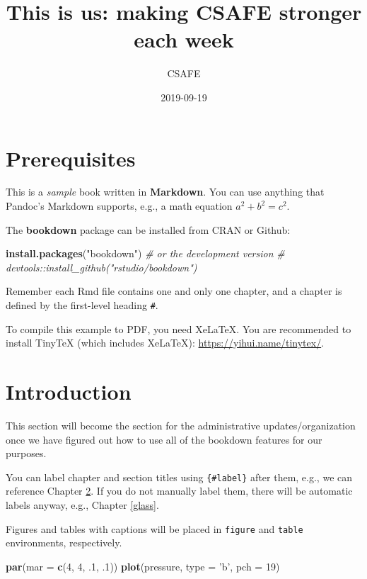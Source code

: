 \documentclass[]{book}
\title{This is us: making CSAFE stronger each week}
\author{CSAFE}
\date{2019-09-19}
\newenvironment{Shaded}{\begin{snugshade}}{\end{snugshade}}
\newcommand{\CommentTok}[1]{\textcolor[rgb]{0.56,0.35,0.01}{\textit{#1}}}
\newcommand{\DataTypeTok}[1]{\textcolor[rgb]{0.13,0.29,0.53}{#1}}
\newcommand{\DecValTok}[1]{\textcolor[rgb]{0.00,0.00,0.81}{#1}}
\newcommand{\FloatTok}[1]{\textcolor[rgb]{0.00,0.00,0.81}{#1}}
\newcommand{\KeywordTok}[1]{\textcolor[rgb]{0.13,0.29,0.53}{\textbf{#1}}}
\newcommand{\NormalTok}[1]{#1}
\newcommand{\StringTok}[1]{\textcolor[rgb]{0.31,0.60,0.02}{#1}}
\begin{document}
\maketitle

{
\setcounter{tocdepth}{1}
\tableofcontents
}
\hypertarget{prerequisites}{%
\chapter{Prerequisites}\label{prerequisites}}

This is a \emph{sample} book written in \textbf{Markdown}. You can use anything that Pandoc's Markdown supports, e.g., a math equation \(a^2 + b^2 = c^2\).

The \textbf{bookdown} package can be installed from CRAN or Github:

\begin{Shaded}
\begin{Highlighting}[]
\KeywordTok{install.packages}\NormalTok{(}\StringTok{"bookdown"}\NormalTok{)}
\CommentTok{# or the development version}
\CommentTok{# devtools::install_github("rstudio/bookdown")}
\end{Highlighting}
\end{Shaded}

Remember each Rmd file contains one and only one chapter, and a chapter is defined by the first-level heading \texttt{\#}.

To compile this example to PDF, you need XeLaTeX. You are recommended to install TinyTeX (which includes XeLaTeX): \url{https://yihui.name/tinytex/}.

\hypertarget{intro}{%
\chapter{Introduction}\label{intro}}

This section will become the section for the administrative updates/organization once we have figured out how to use all of the bookdown features for our purposes.

You can label chapter and section titles using \texttt{\{\#label\}} after them, e.g., we can reference Chapter \ref{intro}. If you do not manually label them, there will be automatic labels anyway, e.g., Chapter \ref{glass}.

Figures and tables with captions will be placed in \texttt{figure} and \texttt{table} environments, respectively.

\begin{Shaded}
\begin{Highlighting}[]
\KeywordTok{par}\NormalTok{(}\DataTypeTok{mar =} \KeywordTok{c}\NormalTok{(}\DecValTok{4}\NormalTok{, }\DecValTok{4}\NormalTok{, }\FloatTok{.1}\NormalTok{, }\FloatTok{.1}\NormalTok{))}
\KeywordTok{plot}\NormalTok{(pressure, }\DataTypeTok{type =} \StringTok{'b'}\NormalTok{, }\DataTypeTok{pch =} \DecValTok{19}\NormalTok{)}
\end{Highlighting}
\end{Shaded}
\end{document}
